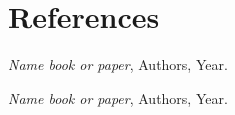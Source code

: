 \section{References}

\begingroup
    \renewcommand{\section}[2]{}%
    \begin{thebibliography}{X}
    
        \textit{Name book or paper}, Authors, Year.
        
        \textit{Name book or paper}, Authors, Year.
        
    \end{thebibliography}
\endgroup

\newpage